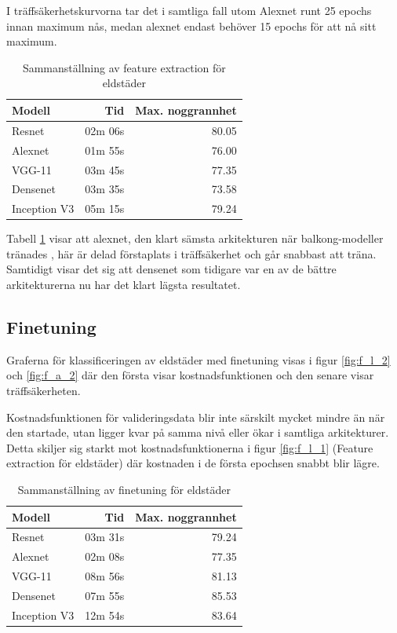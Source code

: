 \documentclass[]{kththesis}
\begin{document}
I träffsäkerhetskurvorna tar det i samtliga fall utom Alexnet runt 25 epochs innan maximum nås, medan alexnet endast behöver 15 epochs för att nå sitt maximum.


\begin{table}[!htbp]
  \centering
  \begin{tabular}{|l|r|r|}
    Modell & Tid & Max. noggrannhet \\ 
    \hline
    Resnet       & 02m 06s & 80.05 \\
    Alexnet      & 01m 55s & 76.00 \\
    VGG-11       & 03m 45s & 77.35 \\
    Densenet     & 03m 35s & 73.58 \\
    Inception V3 & 05m 15s & 79.24 \\
  \end{tabular}
  \caption{Sammanställning av feature extraction för eldstäder}
  \label{fig:sam_3}
\end{table}


Tabell \ref{fig:sam_3} visar att alexnet, den klart sämsta arkitekturen när balkong-modeller tränades , här är delad förstaplats i träffsäkerhet och går snabbast att träna.
Samtidigt visar det sig att densenet som tidigare var en av de bättre arkitekturerna nu har det klart lägsta resultatet.

\subsection{Finetuning}
Graferna för klassificeringen av eldstäder med finetuning visas i figur \ref{fig:f_l_2} och \ref{fig:f_a_2} där den första visar kostnadsfunktionen och den senare visar träffsäkerheten.

Kostnadsfunktionen för valideringsdata blir inte särskilt mycket mindre än när den startade, utan ligger kvar på samma nivå eller ökar i samtliga arkitekturer.
Detta skiljer sig starkt mot kostnadsfunktionerna i figur \ref{fig:f_l_1} (Feature extraction för eldstäder) där kostnaden i de första epochsen snabbt blir lägre. 


\begin{table}[!htbp]
  \centering
  \begin{tabular}{|l|r|r|}
    Modell & Tid & Max. noggrannhet \\ 
    \hline
    Resnet       & 03m 31s & 79.24 \\
    Alexnet      & 02m 08s & 77.35 \\
    VGG-11       & 08m 56s & 81.13 \\
    Densenet     & 07m 55s & 85.53 \\
    Inception V3 & 12m 54s & 83.64 \\
  \end{tabular}
  \caption{Sammanställning av finetuning för eldstäder}
  \label{fig:sam_4}  
\end{table}
\end{document}
